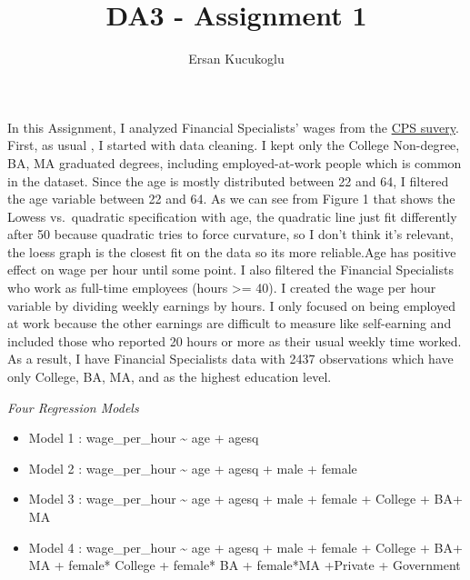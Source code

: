 \documentclass[
]{article}
\title{DA3 - Assignment 1}
\author{Ersan Kucukoglu}
\date{}
\providecommand{\tightlist}{%
  \setlength{\itemsep}{0pt}\setlength{\parskip}{0pt}}
\begin{document}
\maketitle

In this Assignment, I analyzed Financial Specialists' wages from the
\href{https://osf.io/4ay9x/download}{CPS suvery}. First, as usual , I
started with data cleaning. I kept only the College Non-degree, BA, MA
graduated degrees, including employed-at-work people which is common in
the dataset. Since the age is mostly distributed between 22 and 64, I
filtered the age variable between 22 and 64. As we can see from Figure 1
that shows the Lowess vs.~quadratic specification with age, the
quadratic line just fit differently after 50 because quadratic tries to
force curvature, so I don't think it's relevant, the loess graph is the
closest fit on the data so its more reliable.Age has positive effect on
wage per hour until some point. I also filtered the Financial
Specialists who work as full-time employees (hours \textgreater= 40). I
created the wage per hour variable by dividing weekly earnings by hours.
I only focused on being employed at work because the other earnings are
difficult to measure like self-earning and included those who reported
20 hours or more as their usual weekly time worked. As a result, I have
Financial Specialists data with 2437 observations which have only
College, BA, MA, and as the highest education level.

\emph{Four Regression Models}

\begin{itemize}
\tightlist
\item
  Model 1 : wage\_per\_hour \textasciitilde{} age + agesq
\item
  Model 2 : wage\_per\_hour \textasciitilde{} age + agesq + male +
  female
\item
  Model 3 : wage\_per\_hour \textasciitilde{} age + agesq + male +
  female + College + BA+ MA
\item
  Model 4 : wage\_per\_hour \textasciitilde{} age + agesq + male +
  female + College + BA+ MA + female* College + female* BA + female*MA
  +Private + Government
\end{itemize}
\end{document}
